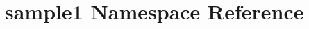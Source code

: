 \hypertarget{namespacesample1}{\section{sample1 \-Namespace \-Reference}
\label{namespacesample1}
}
